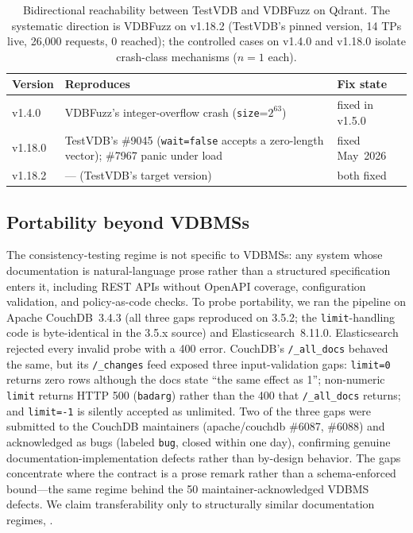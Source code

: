 \documentclass[sigconf]{acmart}
\begin{document}
\begin{table}[t]
\caption{Bidirectional reachability between TestVDB and VDBFuzz on Qdrant. The systematic direction is VDBFuzz on v1.18.2 (TestVDB's pinned version, 14 TPs live, 26{,}000 requests, 0 reached); the controlled cases on v1.4.0 and v1.18.0 isolate crash-class mechanisms ($n{=}1$ each).}
\label{tab:versions}
\small
\begin{tabular}{@{}p{}p{}p{}@{}}
\toprule
Version & Reproduces & Fix state \\
\midrule
v1.4.0 & VDBFuzz's integer-overflow crash (\texttt{size}=$2^{63}$) & fixed in v1.5.0 \\
v1.18.0 & TestVDB's \#9045 (\texttt{wait=false} accepts a zero-length vector); \#7967 panic under load & fixed May~2026 \\
v1.18.2 & --- (TestVDB's target version) & both fixed \\
\bottomrule
\end{tabular}
\end{table}

\subsection{Portability beyond VDBMSs}
\label{subsec:portability}

The consistency-testing regime is not specific to VDBMSs: any system whose documentation is natural-language prose rather than a structured specification enters it, including REST APIs without OpenAPI coverage, configuration validation, and policy-as-code checks. To probe portability, we ran the pipeline on Apache CouchDB~3.4.3 (all three gaps reproduced on 3.5.2; the \texttt{limit}-handling code is byte-identical in the 3.5.x source) and Elasticsearch~8.11.0. Elasticsearch rejected every invalid probe with a 400 error. CouchDB's \texttt{/\_all\_docs} behaved the same, but its \texttt{/\_changes} feed exposed three input-validation gaps: \texttt{limit=0} returns zero rows although the docs state ``the same effect as 1''; non-numeric \texttt{limit} returns HTTP 500 (\texttt{badarg}) rather than the 400 that \texttt{/\_all\_docs} returns; and \texttt{limit=-1} is silently accepted as unlimited. Two of the three gaps were submitted to the CouchDB maintainers (apache/couchdb \#6087, \#6088) and acknowledged as bugs (labeled \texttt{bug}, closed within one day), confirming genuine documentation-implementation defects rather than by-design behavior. The gaps concentrate where the contract is a prose remark rather than a schema-enforced bound---the same regime behind the 50 maintainer-acknowledged VDBMS defects. We claim transferability only to structurally similar documentation regimes, .
\end{document}
